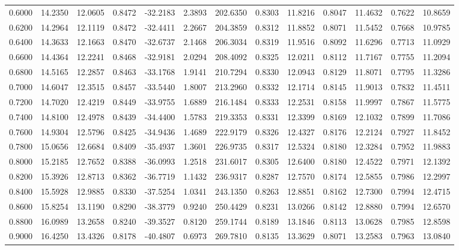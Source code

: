 \begin{tabular}{rrrrrrrrrrrrr}
0.6000 & 14.2350 & 12.0605 & 0.8472 & -32.2183 & 2.3893 & 202.6350 & 0.8303 & 11.8216 & 0.8047 & 11.4632 & 0.7622 & 10.8659 \\
0.6200 & 14.2964 & 12.1119 & 0.8472 & -32.4411 & 2.2667 & 204.3859 & 0.8312 & 11.8852 & 0.8071 & 11.5452 & 0.7668 & 10.9785 \\
0.6400 & 14.3633 & 12.1663 & 0.8470 & -32.6737 & 2.1468 & 206.3034 & 0.8319 & 11.9516 & 0.8092 & 11.6296 & 0.7713 & 11.0929 \\
0.6600 & 14.4364 & 12.2241 & 0.8468 & -32.9181 & 2.0294 & 208.4092 & 0.8325 & 12.0211 & 0.8112 & 11.7167 & 0.7755 & 11.2094 \\
0.6800 & 14.5165 & 12.2857 & 0.8463 & -33.1768 & 1.9141 & 210.7294 & 0.8330 & 12.0943 & 0.8129 & 11.8071 & 0.7795 & 11.3286 \\
0.7000 & 14.6047 & 12.3515 & 0.8457 & -33.5440 & 1.8007 & 213.2960 & 0.8332 & 12.1714 & 0.8145 & 11.9013 & 0.7832 & 11.4511 \\
0.7200 & 14.7020 & 12.4219 & 0.8449 & -33.9755 & 1.6889 & 216.1484 & 0.8333 & 12.2531 & 0.8158 & 11.9997 & 0.7867 & 11.5775 \\
0.7400 & 14.8100 & 12.4978 & 0.8439 & -34.4400 & 1.5783 & 219.3353 & 0.8331 & 12.3399 & 0.8169 & 12.1032 & 0.7899 & 11.7086 \\
0.7600 & 14.9304 & 12.5796 & 0.8425 & -34.9436 & 1.4689 & 222.9179 & 0.8326 & 12.4327 & 0.8176 & 12.2124 & 0.7927 & 11.8452 \\
0.7800 & 15.0656 & 12.6684 & 0.8409 & -35.4937 & 1.3601 & 226.9735 & 0.8317 & 12.5324 & 0.8180 & 12.3284 & 0.7952 & 11.9883 \\
0.8000 & 15.2185 & 12.7652 & 0.8388 & -36.0993 & 1.2518 & 231.6017 & 0.8305 & 12.6400 & 0.8180 & 12.4522 & 0.7971 & 12.1392 \\
0.8200 & 15.3926 & 12.8713 & 0.8362 & -36.7719 & 1.1432 & 236.9317 & 0.8287 & 12.7570 & 0.8174 & 12.5855 & 0.7986 & 12.2997 \\
0.8400 & 15.5928 & 12.9885 & 0.8330 & -37.5254 & 1.0341 & 243.1350 & 0.8263 & 12.8851 & 0.8162 & 12.7300 & 0.7994 & 12.4715 \\
0.8600 & 15.8254 & 13.1190 & 0.8290 & -38.3779 & 0.9240 & 250.4429 & 0.8231 & 13.0266 & 0.8142 & 12.8880 & 0.7994 & 12.6570 \\
0.8800 & 16.0989 & 13.2658 & 0.8240 & -39.3527 & 0.8120 & 259.1744 & 0.8189 & 13.1846 & 0.8113 & 13.0628 & 0.7985 & 12.8598 \\
0.9000 & 16.4250 & 13.4326 & 0.8178 & -40.4807 & 0.6973 & 269.7810 & 0.8135 & 13.3629 & 0.8071 & 13.2583 & 0.7963 & 13.0840 \\

\end{tabular}
